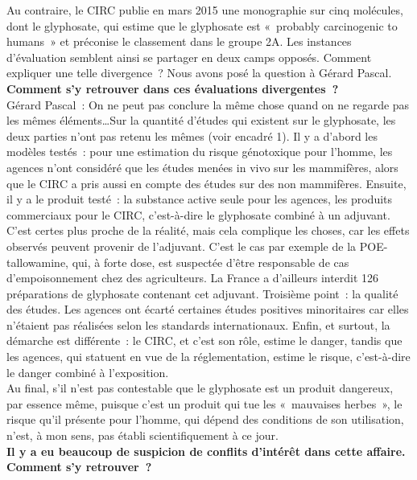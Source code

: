 \documentclass[8pt]{article}
\begin{document}
Au contraire, le CIRC publie en mars 2015 une monographie sur cinq molécules, dont le glyphosate, qui estime que le glyphosate est «~probably carcinogenic to humans~» et préconise le classement dans le groupe 2A.
Les instances d’évaluation semblent ainsi se partager en deux camps opposés. Comment expliquer une telle divergence~? Nous avons posé la question à Gérard Pascal.\\

\textbf{Comment s’y retrouver dans ces évaluations divergentes~?}\\

Gérard Pascal~: On ne peut pas conclure la même chose quand on ne regarde pas les mêmes éléments…Sur la quantité d’études qui existent sur le glyphosate, les deux parties n’ont pas retenu les mêmes (voir encadré 1). Il y a d’abord les modèles testés~: pour une estimation du risque génotoxique pour l’homme, les agences n’ont considéré que les études menées in vivo sur les mammifères, alors que le CIRC a pris aussi en compte des études sur des non mammifères. Ensuite, il y a le produit testé~: la substance active seule pour les agences, les produits commerciaux pour le CIRC, c’est-à-dire le glyphosate combiné à un adjuvant. C’est certes plus proche de la réalité, mais cela complique les choses, car les effets observés peuvent provenir de l’adjuvant. C’est le cas par exemple de la POE-tallowamine, qui, à forte dose, est suspectée d’être responsable de cas d’empoisonnement chez des agriculteurs. La France a d’ailleurs interdit 126 préparations de glyphosate contenant cet adjuvant. Troisième point~: la qualité des études. Les agences ont écarté certaines études positives minoritaires car elles n’étaient pas réalisées selon les standards internationaux. Enfin, et surtout, la démarche est différente~: le CIRC, et c’est son rôle, estime le danger, tandis que les agences, qui statuent en vue de la réglementation, estime le risque, c’est-à-dire le danger combiné à l’exposition.\\

Au final, s’il n’est pas contestable que le glyphosate est un produit dangereux, par essence même, puisque c’est un produit qui tue les «~mauvaises herbes~», le risque qu’il présente pour l’homme, qui dépend des conditions de son utilisation, n’est, à mon sens, pas établi scientifiquement à ce jour.\\

\textbf{Il y a eu beaucoup de suspicion de conflits d’intérêt dans cette affaire. Comment s’y retrouver~?}\\
\end{document}
